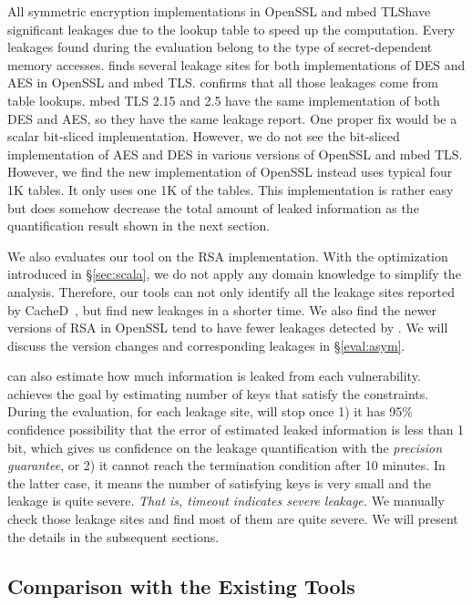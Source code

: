 All symmetric encryption implementations in OpenSSL and mbed TLS\@ have significant
leakages due to the lookup table to speed up the
computation. Every leakages found during the evaluation belong to the type of
secret-dependent memory accesses. \tool{} finds several leakage sites for both 
implementations of DES and AES in
OpenSSL and mbed TLS\@. \tool{} confirms that all those leakages come from table
lookups. mbed TLS 2.15 and 2.5 have the same implementation of both DES and AES, so
they have the same leakage report. One proper fix would be a scalar bit-sliced
implementation. However, we do not see the bit-sliced implementation of AES and
DES in various versions of OpenSSL and mbed TLS\@. However, we find the new
implementation of OpenSSL instead uses typical four 1K tables. It only uses one 1K
of the tables. This implementation is rather easy but does somehow decrease the total
amount of leaked information as the quantification result shown in the next
section.

We also evaluates our tool on the RSA implementation. With the optimization
introduced in \S\ref{sec:scala}, we do not apply any domain knowledge to
simplify the analysis. Therefore, our tools can not only identify all the leakage sites
reported by CacheD~\cite{203878}, but find new leakages in a shorter time. 
We also find the newer
versions of RSA in OpenSSL tend to have fewer leakages detected by \tool{}. We
will discuss the version changes and corresponding leakages in \S\ref{eval:asym}.

\tool{} can also estimate how
much information is leaked from each vulnerability. \tool{} achieves the goal by
estimating number of keys that satisfy the constraints. During the evaluation,
for each leakage site, \tool{} will stop once 1) it has 95\% confidence
possibility that the error of estimated leaked information is less than 1 bit,
which gives us confidence on the leakage quantification with the \emph{precision guarantee}, 
or 2) it cannot reach the termination condition after 10 minutes. In
the latter case, it means the number of satisfying keys is very small and the
leakage is quite severe. \emph{That is, timeout indicates severe leakage.}
\label{loc:timeout}
We manually check those leakage sites and find most of them are quite severe.
We will present the details in the subsequent sections.

\subsection{Comparison with the Existing Tools}
\label{eval:scala}

